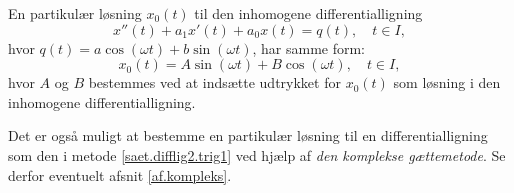 \begin{method}[Trigonometrisk] \label{saet.difflig2.trig1}
En partikulær løsning $ x_0(t) $ til den inhomogene differentialligning
\begin{equation}
x''(t) + a_1x'(t) + a_0x(t) = q(t), \quad t \in I,
\end{equation}
hvor $ q(t) = a\cos(\omega t) + b\sin(\omega t) $, har samme form:
\begin{equation}
x_0(t) =  A\sin(\omega t) + B\cos(\omega t), \quad t \in I,
\end{equation}
hvor $ A $ og $ B $ bestemmes ved at indsætte udtrykket for $ x_0(t) $ som løsning i den inhomogene differentialligning.
\end{method}

\begin{info}
Det er også muligt at bestemme en partikulær løsning til en differentialligning som den i metode \ref{saet.difflig2.trig1} ved hjælp af \textit{den komplekse gættemetode}. Se derfor eventuelt afsnit \ref{af.kompleks}.
\end{info}

